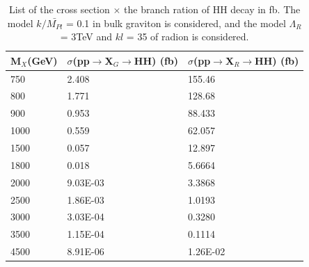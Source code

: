 
\begin{table}[h!]
  \begin{center}
    \begin{tabular}{l|l|l}
    M$_{X}$(GeV) &  $\sigma$(pp$\rightarrow$X$_{G}\rightarrow $HH) (fb)& $\sigma$(pp$\rightarrow$X$_{R}\rightarrow $HH) (fb)\\
    \hline
    750 & 2.408 & 155.46 \\
    800 & 1.771 & 128.68 \\
    900 & 0.953 & 88.433\\
    1000 & 0.559 & 62.057\\
    1500 & 0.057 & 12.897\\
    1800 & 0.018 & 5.6664\\
    2000 & 9.03E-03 & 3.3868\\
    2500 & 1.86E-03 & 1.0193\\
    3000 & 3.03E-04 & 0.3280\\
    3500 & 1.15E-04 & 0.1114\\
    4500 & 8.91E-06 & 1.26E-02\\

    \end{tabular}
  \end{center}

  \caption{List of the cross section $\times$ the branch ration of HH decay in fb. The model $k/\bar{M_{Pl}}$ = 0.1 in bulk graviton is considered, and the model $	\Lambda _R$ = 3TeV and $kl$ = 35 of radion is considered.}
\end{table}



